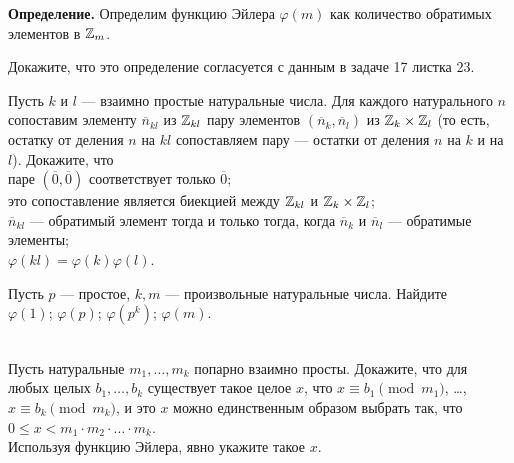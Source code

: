\documentclass[a4paper,12pt]{article}
\newcommand{\ov}{\overline}
\begin{document}
\smallskip
\noindent
{\bf Определение.} Определим функцию Эйлера $\varphi(m)$ как количество обратимых элементов в $\mathbb{Z}_m$.

\smallskip
{}
Докажите, что это определение согласуется с данным в задаче 17 листка $23$.


Пусть $k$ и $l$ --- взаимно простые натуральные числа. Для каждого натурального $n$
сопоставим элементу $\ov{n}_{kl}$ из $\mathbb{Z}_{kl}$ пару элементов $(\ov{n}_k,\ov{n}_l)$ из $\mathbb{Z}_k\times\mathbb{Z}_l$ (то есть, остатку от деления $n$ на $kl$ сопоставляем пару --- остатки от деления $n$ на $k$ и на $l$). Докажите, что
\\
 паре $(\ov{0},\ov{0})$ соответствует только $\ov{0}$;\\
 это сопоставление является биекцией между $\mathbb{Z}_{kl}$ и $\mathbb{Z}_k\times\mathbb{Z}_l$;\\
 $\ov{n}_{kl}$ --- обратимый элемент тогда и только тогда, когда $\ov{n}_k$ и $\ov{n}_l$ --- обратимые элементы;\\
 $\varphi(kl) = \varphi(k)\varphi(l)$.

 Пусть $p$ --- простое, $k,m$ --- произвольные натуральные числа. Найдите\\  $\varphi(1)$;  $\varphi(p)$;  $\varphi(p^k)$;  $\varphi(m)$.

\\
 Пусть натуральные $m_1, \dots, m_k$ попарно взаимно просты.
Докажите, что для любых целых $b_1,\dots,b_k$ существует такое
целое $x$, что
$x\equiv b_1\!\pmod{m_1}$, \dots,
$x\equiv b_k\!\pmod{m_k}$,
и это $x$ можно единственным образом выбрать так, что
$0\leq x< m_1\cdot m_2\cdot\ldots\cdot m_k$.\\
 Используя функцию Эйлера, явно укажите такое $x$.
\end{document}
